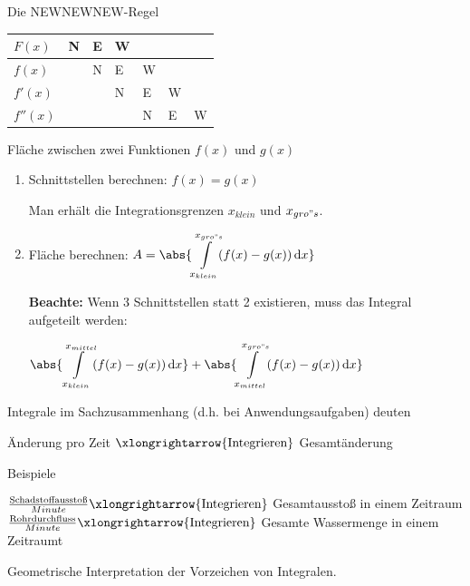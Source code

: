\documentclass[paper=a6,landscape,ngerman,twoside=true,fontsize=12pt]{scrartcl}
\begin{document}
\begin{frage}
	Die NEWNEWNEW-Regel
\end{frage}
\begin{antwort}
\begin{tabular}{C{1.2cm}|C{1.2cm}|C{1.2cm}|C{1.2cm}|C{1.2cm}|C{1.2cm}|C{1.2cm}}
	$F(x)$      & N & E & W &   &   &   \\ \hline
	$f(x)$      &   & N & E & W &   &   \\ \hline
	$f'(x)$     &   &   & N & E & W &   \\ \hline
	$f''(x)$    &   &   &   & N & E & W
\end{tabular}
\end{antwort}

\begin{frage}
	Fläche zwischen zwei Funktionen $f(x)$ und $g(x)$
\end{frage}
\begin{antwort}
		\large
		\begin{enumerate} 
			\item Schnittstellen berechnen: $f(x)=g(x)$
			
			Man erhält die Integrationsgrenzen $x_{klein}$ und $x_{gro{"s}}$.
			\item Fläche berechnen: 
				$A=\abs{\displaystyle\int\limits_{x_{klein}}^{x_{gro{"s}}} \! (f(x)-g(x)) \, \mathrm{d}x}$
			
			\textbf{Beachte:} \Large Wenn 3 Schnittstellen statt 2 existieren, muss das Integral aufgeteilt werden:
			
				$\abs{\displaystyle\int\limits_{x_{klein}}^{x_{mittel}} \! (f(x)-g(x)) \, \mathrm{d}x}+\abs{\displaystyle\int\limits_{x_{mittel}}^{x_{gro{"s}}} \! (f(x)-g(x)) \, \mathrm{d}x}$
		\end{enumerate} 
\end{antwort}
\begin{frage}
	Integrale im Sachzusammenhang (d.h. bei Anwendungsaufgaben) deuten
\end{frage}
\begin{antwort}
	Änderung pro Zeit $\xlongrightarrow{\text{Integrieren}}$ Gesamtänderung 
	
	\bigskip Beispiele
	
	\large\bigskip
	$\frac{\text{Schadstoffausstoß}}{Minute} \xlongrightarrow{\text{Integrieren}}$ Gesamtausstoß in einem Zeitraum
	$\frac{\text{Rohrdurchfluss}}{Minute} \xlongrightarrow{\text{Integrieren}}$ Gesamte Wassermenge in einem Zeitraumt
\end{antwort}
\begin{frage}
	Geometrische Interpretation der Vorzeichen von Integralen.
\end{frage}
\end{document}
